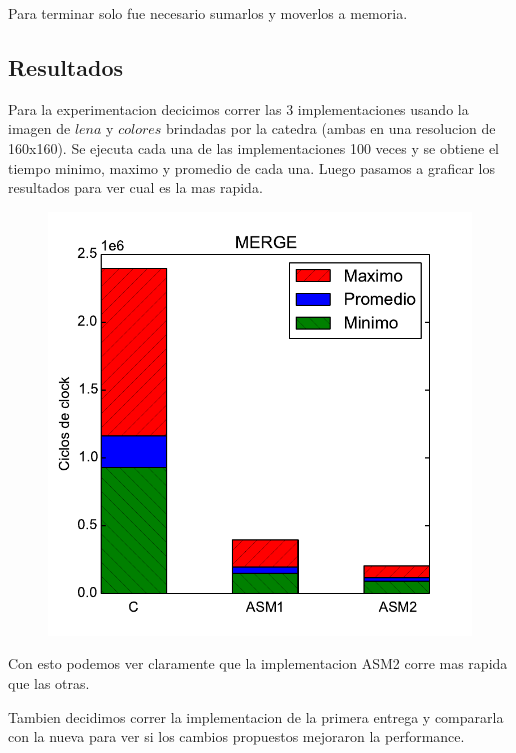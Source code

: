 Para terminar solo fue necesario sumarlos y moverlos a memoria.

\subsection{Resultados}
Para la experimentacion decicimos correr las 3 implementaciones usando la imagen de $lena$ y $colores$ brindadas por la catedra (ambas en una resolucion de 160x160). Se ejecuta cada una de las implementaciones 100 veces y se obtiene el tiempo minimo, maximo y promedio de cada una. Luego pasamos a graficar los resultados para ver cual es la mas rapida.

\begin{figure}[h!]
	\centering
	\includegraphics[scale=0.45]{images/merge_comparation}
\end{figure}

Con esto podemos ver claramente que la implementacion ASM2 corre mas rapida que las otras.

Tambien decidimos correr la implementacion de la primera entrega y compararla con la nueva para ver si los cambios propuestos mejoraron la performance.

